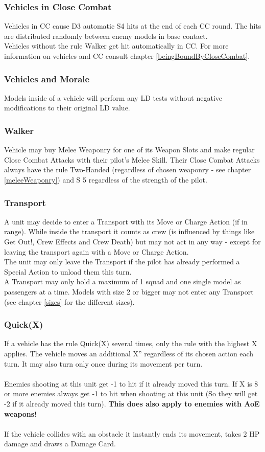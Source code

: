 \documentclass[
	11pt,
	toc=bibliography
	]{article}
\begin{document}
\subsubsection*{Vehicles in Close Combat}
Vehicles in CC cause D3 automatic S4 hits at the end of each CC round. The hits are distributed randomly between enemy models in base contact.\\
Vehicles without the rule Walker get hit automatically in CC. For more information on vehicles and CC consult chapter \ref{beingBoundByCloseCombat}.

\subsubsection*{Vehicles and Morale}
Models inside of a vehicle will perform any LD tests without negative modifications to their original LD value.

\subsubsection*{Walker}
Vehicle may buy Melee Weaponry for one of its Weapon Slots and make regular Close Combat Attacks with their pilot's Melee Skill. Their Close Combat Attacks always have the rule Two-Handed (regardless of chosen weaponry - see chapter \ref{meleeWeaponry}) and S 5 regardless of the strength of the pilot. 

\subsubsection*{Transport}
A unit may decide to enter a Transport with its Move or Charge Action (if in range). While inside the transport it counts as crew (is influenced by things like Get Out!, Crew Effects and Crew Death) but may not act in any way - except for leaving the transport again with a Move or Charge Action. \\
The unit may only leave the Transport if the pilot has already performed a Special Action to unload them this turn. \\
A Transport may only hold a maximum of 1 squad and one single model as passengers at a time. Models with size 2 or bigger may not enter any Transport (see chapter \ref{sizes} for the different sizes).

\subsubsection*{Quick(X)}\label{quick}
If a vehicle has the rule Quick(X) several times, only the rule with the highest X applies. The vehicle moves an additional X'' regardless of its chosen action each turn. It may also turn only once during its movement per turn. \\\\
Enemies shooting at this unit get -1 to hit if it already moved this turn. If X is 8 or more enemies always get -1 to hit when shooting at this unit (So they will get -2 if it already moved this turn). \textbf{This does also apply to enemies with AoE weapons!}\\\\
If the vehicle collides with an obstacle it instantly ends its movement, takes 2 HP damage and draws a Damage Card.
\end{document}
